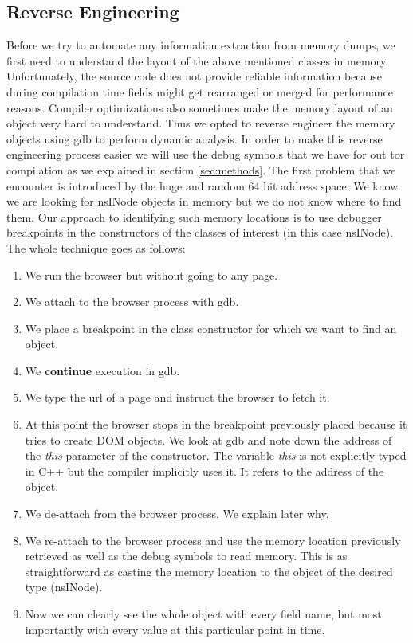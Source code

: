 \subsection{Reverse Engineering}
Before we try to automate any information extraction from memory dumps, we first need to understand the layout of the above mentioned classes in memory. Unfortunately, the source code does not provide reliable information because during compilation time fields might get rearranged or merged for performance reasons. Compiler optimizations also sometimes make the memory layout of an object very hard to understand. Thus we opted to reverse engineer the memory objects using gdb to perform dynamic analysis.
In order to make this reverse engineering process easier we will use the debug symbols that we have for out tor compilation as we explained in section \ref{sec:methods}. The first problem that we encounter is introduced by the huge and random 64 bit address space. We know we are looking for nsINode objects in memory but we do not know where to find them. Our approach to identifying such memory locations is to use debugger breakpoints in the constructors of the classes of interest (in this case nsINode). The whole technique goes as follows:
\begin{enumerate}
	\item We run the browser but without going to any page.
	\item We attach to the browser process with gdb.
	\item We place a breakpoint in the class constructor for which we want to find an object.
	\item We \textbf{continue} execution in gdb.
	\item We type the url of a page and instruct the browser to fetch it.
	\item At this point the browser stops in the breakpoint previously placed because it tries to create DOM objects. We look at gdb and note down the address of the \textit{this} parameter of the constructor. The variable \textit{this} is not explicitly typed in C++ but the compiler implicitly uses it. It refers to the address of the object.
	\item We de-attach from the browser process. We explain later why.
	\item We re-attach to the browser process and use the memory location previously retrieved as well as the debug symbols to read memory. This is as straightforward as casting the memory location to the object of the desired type (nsINode).
	\item Now we can clearly see the whole object with every field name, but most importantly with every value at this particular point in time.
\end{enumerate}

